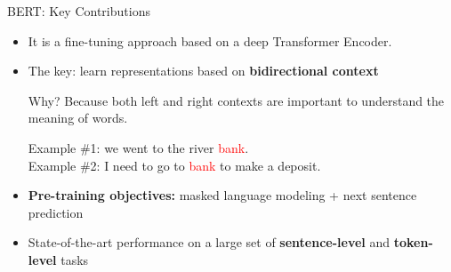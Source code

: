 \documentclass[serif, aspectratio=169]{beamer}
\begin{document}
\begin{frame}{BERT: Key Contributions}
    
    \vspace{0.5cm}
    
    \begin{itemize}
        \item It is a fine-tuning approach based on a deep Transformer Encoder.
        
        \vspace{0.3cm}
        
        \item The key: learn representations based on \textbf{bidirectional context}
        
        \vspace{0.2cm}
        
        \textcolor{green!50!black}{
        Why? Because both left and right contexts are important to understand the meaning of words.}
        
        \vspace{0.2cm}
        
        Example \#1: we went to the river \textcolor{red}{bank}. \\
        Example \#2: I need to go to \textcolor{red}{bank} to make a deposit.
        
        \vspace{0.5cm}
        
        \item \textbf{Pre-training objectives:} masked language modeling + next sentence prediction
        
        \vspace{0.3cm}
        
        \item State-of-the-art performance on a large set of \textbf{sentence-level} and \textbf{token-level} tasks
    \end{itemize}
    
\end{frame}
\end{document}
